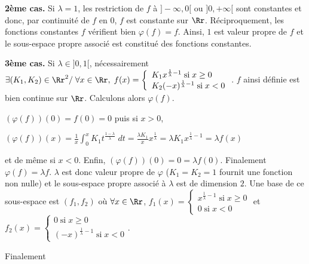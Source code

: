 {\begin{enumerate}
{\textbf{2ème cas.} Si $\lambda= 1$, les restriction de $f$ à $]-\infty,0[$ ou $]0,+\infty[$ sont constantes et donc, par continuité de $f$ en $0$, $f$ est constante sur $\Rr$. Réciproquement, les fonctions constantes $f$ vérifient bien $\varphi(f) = f$. Ainsi, $1$ est valeur propre de $f$ et le sous-espace propre associé est constitué des fonctions constantes.

\textbf{3ème cas.} Si $\lambda\in]0,1[$, nécessairement $\exists(K_1,K_2)\in\Rr^2/\;\forall x\in\Rr,\;f(x)=\left\{
\begin{array}{l}
K_1x^{\frac{1}{\lambda}-1}\;\text{si}\;x\geq0\\
K_2(-x)^{\frac{1}{\lambda}-1}\;\text{si}\;x < 0
\end{array}
\right.$. $f$ ainsi définie est bien continue sur $\Rr$. Calculons alors $\varphi(f)$.

 
$(\varphi(f))(0)=f(0)=0$ puis si $x > 0$,

\begin{center}
$(\varphi(f))(x)=\frac{1}{x}\int_{0}^{x}K_1t^{\frac{1-\lambda}{\lambda}}\;dt=\frac{\lambda K_1}{x}x^{\frac{1}{\lambda}}=\lambda K_1 x^{\frac{1}{\lambda}-1}=\lambda f(x)$
\end{center}

et de même si $x < 0$. Enfin, $(\varphi(f))(0)=0=\lambda f(0)$. Finalement $\varphi(f) =\lambda f$. $\lambda$ est donc valeur propre de $\varphi$ ($K_1 = K_2 = 1$ fournit une fonction non nulle) et le sous-espace propre associé à $\lambda$ est de dimension $2$. Une base de ce sous-espace est $(f_1,f_2)$ où $\forall x\in\Rr$, $f_1(x)=\left\{
\begin{array}{l}
x^{\frac{1}{\lambda}-1}\;\text{si}\;x\geq0\\
0\;\text{si}\;x < 0
\end{array}
\right.$ et $f_2(x) =\left\{
\begin{array}{l}
0\;\text{si}\;x\geq0\\
(-x)^{\frac{1}{\lambda}-1}\;\text{si}\;x < 0
\end{array}
\right.$.

Finalement

\begin{center}
\fbox{
$\text{Sp}(\varphi)= ]0,1]$.
}
\end{center}}
\end{enumerate}
}
